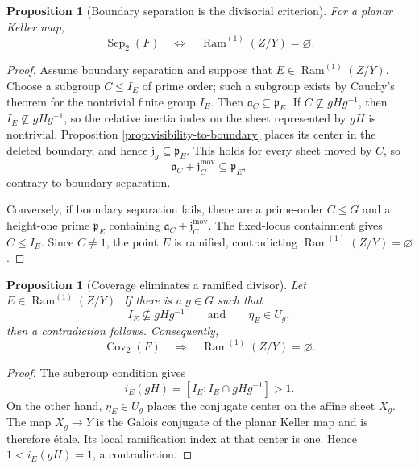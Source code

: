 \documentclass[11pt]{article}
\newtheorem{proposition}[theorem]{Proposition}
\theoremstyle{remark}
\theoremstyle{definition}
\DeclareMathOperator{\Ram}{Ram}
\begin{document}
\begin{proposition}[Boundary separation is the divisorial criterion]
\label{prop:boundary-separation-divisorial-criterion}
For a planar Keller map,
\[
  \operatorname{Sep}_2(F)
  \quad\Longleftrightarrow\quad
  \Ram^{(1)}(Z/Y)=\varnothing.
\]
\end{proposition}

\begin{proof}
Assume boundary separation and suppose that
\(E\in\Ram^{(1)}(Z/Y)\).  Choose a subgroup
\(C\leq I_E\) of prime order; such a subgroup exists by Cauchy's theorem
for the nontrivial finite group \(I_E\).  Then
\(\mathfrak a_C\subseteq\mathfrak p_E\).  If
\(C\nsubseteq gHg^{-1}\), then
\(I_E\nsubseteq gHg^{-1}\), so the relative inertia index on the sheet
represented by \(gH\) is nontrivial.  Proposition
\ref{prop:visibility-to-boundary} places its center in the deleted boundary,
and hence \(\mathfrak j_g\subseteq\mathfrak p_E\).  This holds for every
sheet moved by \(C\), so
\[
  \mathfrak a_C+\mathfrak j_C^{\mathrm{mov}}
  \subseteq\mathfrak p_E,
\]
contrary to boundary separation.

Conversely, if boundary separation fails, there are a prime-order
\(C\leq G\) and a height-one prime \(\mathfrak p_E\) containing
\(\mathfrak a_C+\mathfrak j_C^{\mathrm{mov}}\).  The fixed-locus
containment gives \(C\leq I_E\).  Since \(C\neq1\), the point \(E\) is
ramified, contradicting
\(\Ram^{(1)}(Z/Y)=\varnothing\).
\end{proof}

\begin{proposition}[Coverage eliminates a ramified divisor]
\label{prop:coverage-eliminates-ramified-divisor}
Let \(E\in\Ram^{(1)}(Z/Y)\).  If there is a \(g\in G\) such that
\[
  I_E\nsubseteq gHg^{-1}
  \qquad\text{and}\qquad
  \eta_E\in U_g,
\]
then a contradiction follows.  Consequently,
\[
  \operatorname{Cov}_2(F)
  \quad\Longrightarrow\quad
  \Ram^{(1)}(Z/Y)=\varnothing.
\]
\end{proposition}

\begin{proof}
The subgroup condition gives
\[
  i_E(gH)=[I_E:I_E\cap gHg^{-1}]>1.
\]
On the other hand, \(\eta_E\in U_g\) places the conjugate center on the
affine sheet \(X_g\).  The map \(X_g\to Y\) is the Galois conjugate of
the planar Keller map and is therefore \'etale.  Its local ramification
index at that center is one.  Hence \(1<i_E(gH)=1\), a contradiction.
\end{proof}
\end{document}
